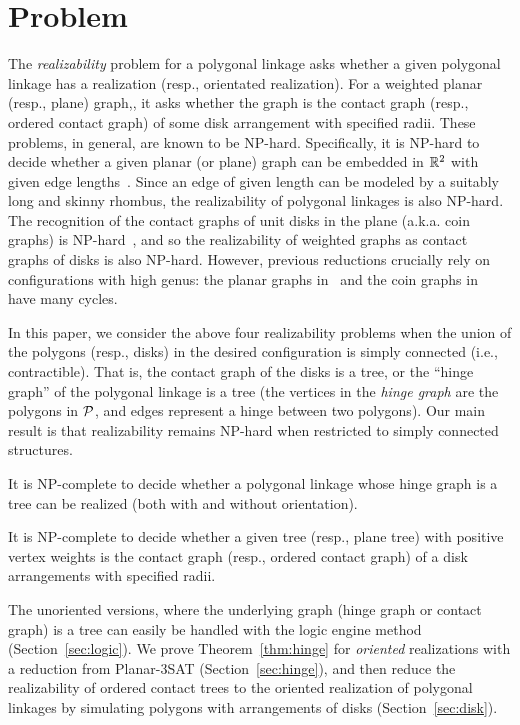 \section{Problem}
The \emph{realizability} problem for a polygonal linkage asks whether a given polygonal linkage has 
a realization (resp., orientated realization). For a weighted planar (resp., plane) graph,, it asks 
whether the graph is
the contact graph (resp., ordered contact graph) of some disk arrangement with specified radii. 
These problems, in general, are known to be NP-hard. Specifically, it is NP-hard to decide whether a 
given planar (or plane) graph can be embedded in $\mathbb{R}^2$ with given edge lengths~\cite{CDD+10,EW90}. 
Since an edge of given length can be modeled by a suitably long and skinny rhombus, the 
realizability of polygonal linkages is also NP-hard. The recognition of the contact graphs of unit 
disks in the plane (a.k.a. coin graphs) is NP-hard~\cite{BK98}, and so the realizability of weighted 
graphs as contact graphs of disks is also NP-hard. However, previous reductions crucially rely on 
configurations with high genus: the planar graphs in~\cite{CDD+10,EW90} and the coin graphs 
in~\cite{BK98} have many cycles.

In this paper, we consider the above four realizability problems when the union of the polygons 
(resp., disks) in the desired configuration is simply connected (i.e., contractible). That is, the 
contact graph of the disks is a tree, or the ``hinge graph'' of the polygonal linkage is a tree (the 
vertices in the \emph{hinge graph} are the polygons in ${\cal P}$, and edges represent a hinge between 
two polygons). Our main result is that realizability remains NP-hard when restricted to simply 
connected structures.
 
\begin{thm}\label{thm:hinge}
It is NP-complete to decide whether a polygonal linkage whose hinge graph is a tree can be realized 
(both with and without orientation).
\end{thm}

\begin{thm}\label{thm:disk}
It is NP-complete to decide whether a given tree (resp., plane tree) with positive vertex weights
is the contact graph (resp., ordered contact graph) of a disk arrangements with specified radii.
\end{thm}

The unoriented versions, where the underlying graph (hinge graph or contact graph) is a tree can 
easily be handled with the logic engine method (Section~\ref{sec:logic}). We prove 
Theorem~\ref{thm:hinge} for \emph{oriented} realizations with a reduction from {\sc Planar-3SAT} 
(Section~\ref{sec:hinge}), and then reduce the realizability of ordered contact trees to the 
oriented realization of polygonal linkages by simulating polygons with arrangements of disks 
(Section~\ref{sec:disk}).

